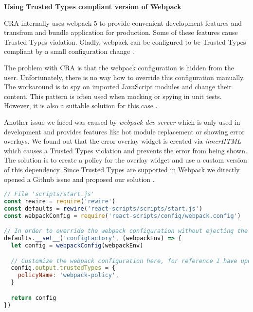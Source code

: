 \medskip
\begin{flushleft}\textbf {Using Trusted Types compliant version of Webpack}\end{flushleft}
\medskip

CRA internally uses webpack 5 to provide convenient development features and transfrom and bundle
application for production. Some of these features cause Trusted Types violation. Gladly, webpack
can be configured to be Trusted Types compliant by a small configuration change
\cite{webpack_tt_config}.

The problem with CRA is that the webpack configuration is hidden from the user. Unfortunately, there
is no way how to override this configuration manually. The workaround is to spy on imported
JavaScript modules and change their content. This pattern is often used when mocking or spying in
unit tests. However, it is also a suitable solution for this case \cite{cra_modify_webpack_config}.

Another issue we faced was caused by \emph{webpack-dev-server} which is only used in development and
provides features like hot module replacement or showing error overlays. We found out that the error
overlay widget is created via \emph{innerHTML} which causes a Trusted Types violation and prevents
the error from being shown. The solution is to create a policy for the overlay widget and use a
custom version of this dependency. Since Trusted Types are supported in Webpack we directly opened a
Github issue \cite{tt_webpack_dev_server:issue} and proposed our solution
\cite{tt_webpack_dev_server:pr}.

\bigskip
\begin{lstlisting}[language=JavaScript, caption=Script to start React application with Trusted Types enabled in webpack]
// File 'scripts/start.js'
const rewire = require('rewire')
const defaults = rewire('react-scripts/scripts/start.js')
const webpackConfig = require('react-scripts/config/webpack.config')

// In order to override the webpack configuration without ejecting the create-react-app
defaults.__set__('configFactory', (webpackEnv) => {
  let config = webpackConfig(webpackEnv)

  // Customize the webpack configuration here, for reference I have updated webpack externals field
  config.output.trustedTypes = {
    policyName: 'webpack-policy',
  }

  return config
})
\end{lstlisting}

